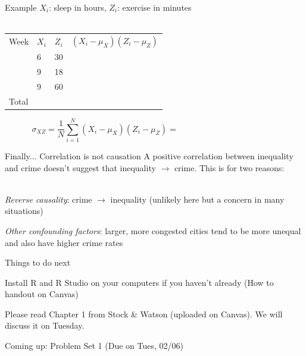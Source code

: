 \documentclass{./../div_teaching_slides}
\begin{document}
\begin{frame}{Example}
\vspace{-0.25em}
$X_i$: sleep in hours, $Z_i$: exercise in minutes \\~\\
\begin{tabularx}{1\textwidth}{P{1.5cm}P{1.5cm}P{1.5cm}Y}
\hline \addlinespace[0.5em]
Week & $X_i$ & $Z_i$ & $(X_i-\mu_X)(Z_i-\mu_Z)$   \\ \addlinespace[0.5em] \hline {} & 6 & 30 &    \\ \hline {} & 9 & 18 &    \\ \hline {} & 9 & 60 &    \\ \hline \addlinespace[0.5em]
 Total & & & \\
 \hline 
\end{tabularx} 
$$ \sigma_{XZ} = \frac{1}{N}\sum_{i=1}^N (X_i-\mu_X)(Z_i-\mu_Z) = \hspace{5cm} $$
\end{frame}


\begin{frame}{Finally... Correlation is not causation}
A positive correlation between inequality and crime doesn't suggest that inequality $\rightarrow$ crime. This is for two reasons: \\~\\
\begin{witemize}
  \item \textit{Reverse causality}: crime $\rightarrow$ inequality (unlikely here but a concern in many situations)
  \item \textit{Other confounding factors}: larger, more congested cities tend to be more unequal and also have higher crime rates
\end{witemize}
\end{frame}


\begin{frame}{Things to do next}
\begin{witemize}
\item Install R and R Studio on your computers if you haven't already (How to handout on Canvas)
\item Please read Chapter 1 from Stock \& Watson (uploaded on Canvas). We will discuss it on Tuesday. 
\item Coming up: Problem Set 1 (Due on Tues, 02/06)
\end{witemize}
\end{frame}
\end{document}
